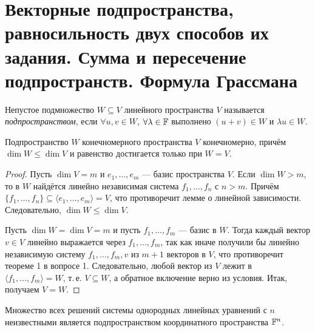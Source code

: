 \section{Векторные подпространства, равносильность двух способов их задания. Сумма и пересечение подпространств. Формула Грассмана}

\begin{definition}
    Непустое подмножество $W \subseteq V$ линейного пространства $V$ называется \textit{подпространством}, если $\forall u, v \in W$, $\forall \lambda \in \mathbb{F}$ выполнено $(u + v) \in W$ и $\lambda u \in W$.
\end{definition}

\begin{lemma}
    Подпространство $W$ конечномерного пространства $V$ конечномерно, причём $\dim W \leqslant \dim V$ и равенство достигается только при $W = V$.
\end{lemma}

\begin{proof}
    Пусть $\dim V = m$ и $e_1, \ldots, e_m$ --- базис пространства $V$. Если $\dim W > m$, то в $W$ найдётся линейно независимая система $f_1, \ldots, f_n$ с $n > m$. Причём $\{f_1, \ldots, f_n\} \subseteq \langle e_1, \ldots, e_m\rangle = V$, что противоречит лемме о линейной зависимости. Следовательно, $\dim W \leqslant \dim V$.

    Пусть $\dim W = \dim V = m$ и пусть $f_1, \ldots, f_m$ --- базис в $W$. Тогда каждый вектор $v \in V$ линейно выражается через $f_1, \ldots, f_m$, так как иначе получили бы линейно независимую систему $f_1, \ldots, f_m, v$ из $m + 1$ векторов в $V$, что противоречит теореме 1 в вопросе 1. Следовательно, любой вектор из $V$ лежит в $\langle f_1, \ldots, f_m\rangle = W$, т.\,е. $V \subseteq W$, а обратное включение верно из условия. Итак, получаем $V = W$.
\end{proof}

\begin{proposal}
    Множество всех решений системы однородных линейных уравнений с $n$ неизвестными является подпространством координатного пространства $\mathbb{F}^n$.
\end{proposal}

